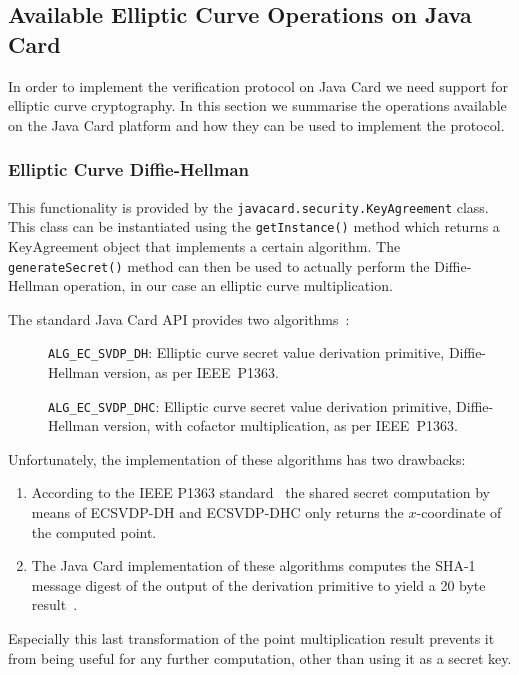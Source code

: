 \subsection{Available Elliptic Curve Operations on Java Card}

In order to implement the verification protocol on Java Card we need support for
elliptic curve cryptography. In this section we summarise the operations
available on the Java Card platform and how they can be used to implement the
protocol.

\subsubsection{Elliptic Curve Diffie-Hellman}\label{sec:ecdh-api}

This functionality is provided by the \texttt{javacard.security.KeyAgreement}
class. This class can be instantiated using the \texttt{getInstance()} method
which returns a KeyAgreement object that implements a certain algorithm. The
\texttt{generateSecret()} method can then be used to actually perform the
Diffie-Hellman operation, in our case an elliptic curve multiplication.

The standard Java Card API provides two algorithms~\cite{jcapi222}:
\begin{description}
  \item[]\texttt{ALG\_EC\_SVDP\_DH}: Elliptic curve secret value derivation primitive,
    Diffie-Hellman version, as per IEEE~P1363.
  \item[]\texttt{ALG\_EC\_SVDP\_DHC}: Elliptic curve secret value derivation primitive,
    Diffie-Hellman version, with cofactor multiplication, as
    per IEEE~P1363.
\end{description}
Unfortunately, the implementation of these algorithms has two drawbacks:
\begin{enumerate}
  \item According to the IEEE P1363 standard~\cite{IEEE_P1363} the shared
    secret computation by means of ECSVDP-DH and ECSVDP-DHC only returns the
    $x$-coordinate of the computed point.
  \item The Java Card implementation of these algorithms computes the SHA-1
    message digest of the output of the derivation primitive to yield a 20 byte
    result~\cite{jcapi222}.
\end{enumerate}

Especially this last transformation of the point multiplication result prevents
it from being useful for any further computation, other than using it as a
secret key.

